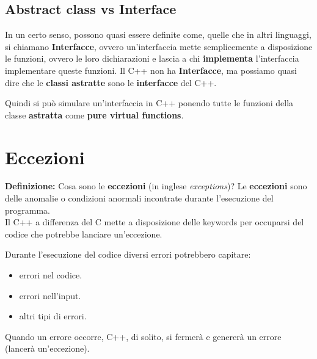 \subsection{Abstract class vs Interface}

\textsf{\small In un certo senso, possono quasi essere definite come, quelle che in altri linguaggi, si chiamano \textbf{Interfacce}, ovvero un'interfaccia mette semplicemente a disposizione le funzioni, ovvero le loro dichiarazioni e lascia a chi \textbf{implementa} l'interfaccia implementare queste funzioni. Il C++ non ha \textbf{Interfacce}, ma possiamo quasi dire che le \textbf{classi astratte} sono le \textbf{interfacce} del C++.} \break

\textsf{\small Quindi si può simulare un'interfaccia in C++ ponendo tutte le funzioni della classe \textbf{astratta} come \textbf{pure virtual functions}.} \\


\newpage

\section{Eccezioni}

\textsf{\small \textbf{Definizione: } Cosa sono le \textbf{eccezioni} (in inglese \emph{exceptions})? Le \textbf{eccezioni} sono delle anomalie o condizioni anormali incontrate durante l'esecuzione del programma.} \\

\textsf{\small Il C++ a differenza del C mette a disposizione delle keywords per occuparsi del codice che potrebbe lanciare un'eccezione.} \break

\textsf{\small Durante l'esecuzione del codice diversi errori potrebbero capitare: } \\

\begin{itemize}
	\item \textsf{\small errori nel codice.}
	\item \textsf{\small errori nell'input.}
	\item \textsf{\small altri tipi di errori.}
\end{itemize}

\textsf{\small Quando un errore occorre, C++, di solito, si fermerà e genererà un errore (lancerà un'eccezione).} \\

